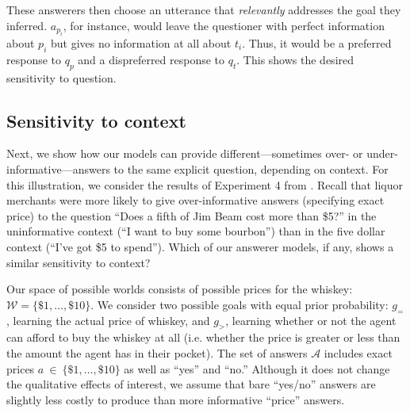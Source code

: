 \documentclass[11pt, floatsintext]{apa6}
\begin{document}
These answerers then choose an utterance that \emph{relevantly} addresses the goal they inferred. $a_{p_i}$, for instance, would leave the questioner with perfect information about $p_i$ but gives no information at all about $t_i$. Thus, it would be a preferred response to $q_p$ and a dispreferred response to $q_t$. This shows the desired sensitivity to question.

\subsection{Sensitivity to context}

Next, we show how our models can provide different---sometimes over- or under-informative---answers to the same explicit question, depending on context. For this illustration, we consider the results of Experiment 4 from . Recall that liquor merchants were more likely to give over-informative answers (specifying exact price) to the question ``Does a fifth of Jim Beam cost more than \$5?'' in the uninformative context (``I want to buy some bourbon'') than in the five dollar context (``I've got \$5 to spend''). Which of our answerer models, if any, shows a similar sensitivity to context?

Our space of possible worlds consists of possible prices for the whiskey: $\mathcal{W} = \{\$1, \dots, \$10\}$. We consider two possible goals with equal prior probability: $g_=$, learning the actual price of whiskey,  and $g_>$, learning whether or not the agent can afford to buy the whiskey at all (i.e. whether the price is greater or less than the amount the agent has in their pocket). The set of answers $\mathcal{A}$ includes exact prices $a~\in~\{\$1, \dots, \$10\}$ as well as ``yes'' and ``no.'' 
Although it does not change the qualitative effects of interest, we assume that bare ``yes/no'' answers are slightly less costly to produce than more informative ``price'' answers.

\end{document}
